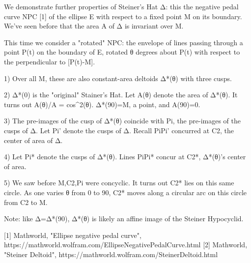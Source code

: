 We demonstrate further properties of Steiner's Hat Δ: this the negative pedal curve NPC [1] of the ellipse E with respect to a fixed point M on its boundary. We've seen before that the area A of Δ is invariant over M.

This time we consider a "rotated" NPC: the envelope of lines passing through a point P(t) on the boundary of E, rotated θ degrees about P(t) with respect to the perpendicular to [P(t)-M].

1) Over all M, these are also constant-area deltoids Δ*(θ) with three cusps. 

2) Δ*(0) is the "original" Stainer's Hat. Let A(θ) denote the area of Δ*(θ). It turns out A(θ)/A = cos^2(θ). Δ*(90)=M, a point, and A(90)=0.

3) The pre-images of the cusp of Δ*(θ) coincide with Pi, the pre-images of the cusps of Δ. Let Pi' denote the cusps of Δ. Recall PiPi' concurred at C2, the center of area of Δ.

4) Let Pi* denote the cusps of Δ*(θ). Lines PiPi* concur at C2*, Δ*(θ)'s center of area.

5) We saw before M,C2,Pi were concyclic. It turns out C2* lies on this same circle. As one varies θ from 0 to 90, C2* moves along a circular arc on this circle from C2 to M.

Note: like Δ=Δ*(90), Δ*(θ) is likely an affine image of the Steiner Hypocyclid.

[1] Mathworld, "Ellipse negative pedal curve", https://mathworld.wolfram.com/EllipseNegativePedalCurve.html 
[2] Mathworld, "Steiner Deltoid", https://mathworld.wolfram.com/SteinerDeltoid.html